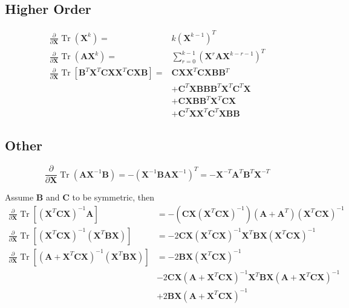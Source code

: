 \documentclass[oneside]{book}
\begin{document}
\subsection{Higher Order}

\begin{align*}
\frac{\partial}{\partial \mathbf{X}} \operatorname{Tr}\left(\mathbf{X}^k\right)= & k\left(\mathbf{X}^{k-1}\right)^T \\
\frac{\partial}{\partial \mathbf{X}} \operatorname{Tr}\left(\mathbf{A} \mathbf{X}^k\right)= & \sum_{r=0}^{k-1}\left(\mathbf{X}^r \mathbf{A X}^{k-r-1}\right)^T \\
\frac{\partial}{\partial \mathbf{X}} \operatorname{Tr}\left[\mathbf{B}^T \mathbf{X}^T \mathbf{C X} \mathbf{X}^T \mathbf{C X B}\right]= & \mathbf{C X} \mathbf{X}^T \mathbf{C X B B}{ }^T \\
& +\mathbf{C}^T \mathbf{X B B} \mathbf{B}^T \mathbf{X}^T \mathbf{C}^T \mathbf{X} \\
& +\mathbf{C X B B}^T \mathbf{X}^T \mathbf{C X} \\
& +\mathbf{C}^T \mathbf{X X}^T \mathbf{C}^T \mathbf{X} \mathbf{B B}
\end{align*}

\subsection{Other}
$$
\frac{\partial}{\partial \mathbf{X}} \operatorname{Tr}\left(\mathbf{A} \mathbf{X}^{-1} \mathbf{B}\right)=-\left(\mathbf{X}^{-1} \mathbf{B} \mathbf{A} \mathbf{X}^{-1}\right)^T=-\mathbf{X}^{-T} \mathbf{A}^T \mathbf{B}^T \mathbf{X}^{-T}
$$

Assume $\mathbf{B}$ and $\mathbf{C}$ to be symmetric, then
$$
\begin{aligned}
\frac{\partial}{\partial \mathbf{X}} \operatorname{Tr}\left[\left(\mathbf{X}^T \mathbf{C X}\right)^{-1} \mathbf{A}\right] & =-\left(\mathbf{C X}\left(\mathbf{X}^T \mathbf{C X}\right)^{-1}\right)\left(\mathbf{A}+\mathbf{A}^T\right)\left(\mathbf{X}^T \mathbf{C X}\right)^{-1} \\
\frac{\partial}{\partial \mathbf{X}} \operatorname{Tr}\left[\left(\mathbf{X}^T \mathbf{C X}\right)^{-1}\left(\mathbf{X}^T \mathbf{B X}\right)\right] & =-2 \mathbf{C X}\left(\mathbf{X}^T \mathbf{C X}\right)^{-1} \mathbf{X}^T \mathbf{B X}\left(\mathbf{X}^T \mathbf{C X}\right)^{-1} \\
\frac{\partial}{\partial \mathbf{X}} \operatorname{Tr}\left[\left(\mathbf{A}+\mathbf{X}^T \mathbf{C X}\right)^{-1}\left(\mathbf{X}^T \mathbf{B X}\right)\right] & =-2 \mathbf{B X}\left(\mathbf{X}^T \mathbf{C X}\right)^{-1} \\
& -2 \mathbf{C X}\left(\mathbf{A}+\mathbf{X}^T \mathbf{C X}\right)^{-1} \mathbf{X}^T \mathbf{B X}\left(\mathbf{A}+\mathbf{X}^T \mathbf{C X}\right)^{-1} \\
& +2 \mathbf{B X}\left(\mathbf{A}+\mathbf{X}^T \mathbf{C X}\right)^{-1}
\end{aligned}
$$
\end{document}
